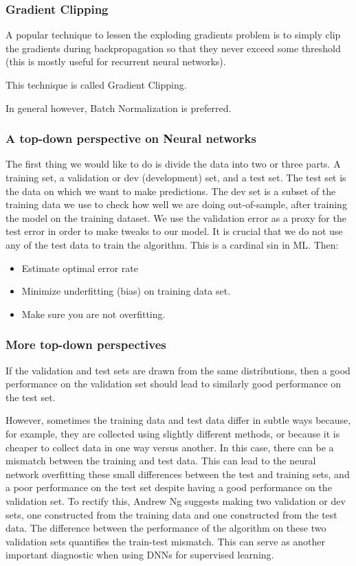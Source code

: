 \documentclass{beamer}
\begin{document}
\begin{frame}
\frametitle{Gradient Clipping}

A popular technique to lessen the exploding gradients problem is to
simply clip the gradients during backpropagation so that they never
exceed some threshold (this is mostly useful for recurrent neural
networks).

This technique is called Gradient Clipping.

In general however, Batch
Normalization is preferred.
\end{frame}

\begin{frame}
\frametitle{A top-down perspective on Neural networks}

The first thing we would like to do is divide the data into two or
three parts. A training set, a validation or dev (development) set,
and a test set. The test set is the data on which we want to make
predictions. The dev set is a subset of the training data we use to
check how well we are doing out-of-sample, after training the model on
the training dataset. We use the validation error as a proxy for the
test error in order to make tweaks to our model. It is crucial that we
do not use any of the test data to train the algorithm. This is a
cardinal sin in ML. Then:

\begin{itemize}
\item Estimate optimal error rate

\item Minimize underfitting (bias) on training data set.

\item Make sure you are not overfitting.
\end{itemize}

\noindent
\end{frame}

\begin{frame}
\frametitle{More top-down perspectives}

If the validation and test sets are drawn from the same distributions,
then a good performance on the validation set should lead to similarly
good performance on the test set. 

However, sometimes
the training data and test data differ in subtle ways because, for
example, they are collected using slightly different methods, or
because it is cheaper to collect data in one way versus another. In
this case, there can be a mismatch between the training and test
data. This can lead to the neural network overfitting these small
differences between the test and training sets, and a poor performance
on the test set despite having a good performance on the validation
set. To rectify this, Andrew Ng suggests making two validation or dev
sets, one constructed from the training data and one constructed from
the test data. The difference between the performance of the algorithm
on these two validation sets quantifies the train-test mismatch. This
can serve as another important diagnostic when using DNNs for
supervised learning.
\end{frame}
\end{document}
